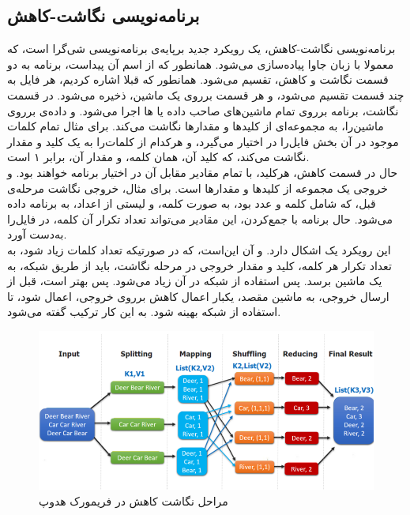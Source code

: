 \documentclass[12pt,onecolumn,a4paper]{article}
\begin{document}
\subsection{برنامه‌نویسی نگاشت-کاهش}
برنامه‌نویسی نگاشت-کاهش، یک رویکرد جدید برپایه‌ی برنامه‌نویسی شی‌گرا است، که معمولا با زبان جاوا پیاده‌سازی می‌شود. همانطور که از اسم آن پیداست، برنامه به دو قسمت نگاشت و کاهش، تقسیم می‌شود.
همانطور که قبلا اشاره کردیم، هر فایل به چند قسمت تقسیم می‌شود، و هر قسمت برروی یک ماشین، ذخیره می‌شود. در قسمت نگاشت، برنامه برروی تمام ماشین‌های صاحب داده یا ها اجرا می‌شود. و داده‌ی برروی ماشین‌را،
به مجموعه‌ای از کلیدها و مقدارها نگاشت می‌کند. برای مثال تمام کلمات موجود در آن بخش فایل‌را در اختیار می‌گیرد، و هرکدام از کلمات‌را به یک کلید و مقدار نگاشت می‌کند، که کلید آن، همان کلمه، و مقدار آن، برابر ۱ است. \\
حال در قسمت کاهش، هرکلید، با تمام مقادیر مقابل آن در اختیار برنامه خواهند بود. و خروجی یک مجموعه از کلیدها و مقدارها است. برای مثال، خروجی نگاشت مرحله‌ی قبل، که شامل کلمه و عدد بود، به صورت کلمه، و لیستی از اعداد، به برنامه داده می‌شود.
حال برنامه با جمع‌کردن، این مقادیر می‌تواند تعداد تکرار آن کلمه، در فایل‌را به‌دست آورد. \\
این رویکرد یک اشکال دارد. و آن این‌است، که در صورتیکه تعداد کلمات زیاد شود، به تعداد تکرار هر کلمه، کلید و مقدار خروجی در مرحله نگاشت، باید از طریق شبکه، به یک ماشین برسد. پس استفاده از شبکه در آن زیاد می‌شود.
پس بهتر است، قبل از ارسال خروجی، به ماشین مقصد، یکبار اعمال کاهش برروی خروجی، اعمال شود، تا استفاده از شبکه بهینه شود. به این کار ترکیب گفته می‌شود.

\begin{figure}[h!]
\centering
        \includegraphics[width=1.0\textwidth]{hadoop-mapreduce.png}
        \caption{مراحل نگاشت کاهش در فریمورک هدوپ}
\end{figure}
\end{document}

